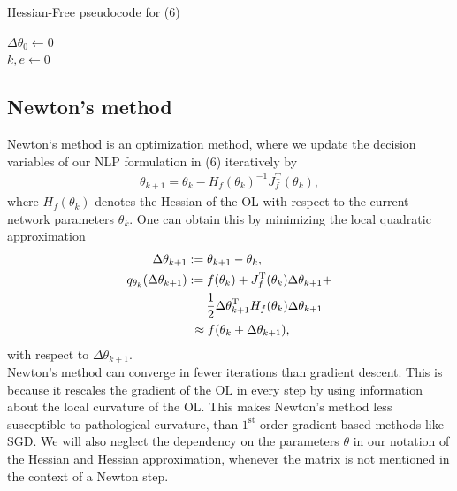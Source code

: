 \documentclass[conference]{IEEEtran}
\begin{document}
	\begin{algorithm}
		\caption{Hessian-Free pseudocode for (6)}\label{alg:two}
		$\Delta\theta_{0}\gets 0$\\
		$k, e\gets 0$\\
		\KwOut{$\theta^{\star}$}
	\end{algorithm}
	\subsection{Newton's method}
	\noindent
	Newton`s method is an optimization method, where we update the decision variables of our NLP formulation in (6) iteratively by
	\begin{align}
	\theta_{k+1} = \theta_{k} -H_{f}(\theta_{k})^{-1} J_{f}^{\mathrm{T}}(\theta_{k}),
	\end{align}
	where $H_{f}(\theta_{k})$ denotes the Hessian of the OL with respect to the current network parameters $\theta_{k}$. One can obtain this by minimizing the local quadratic approximation
	\begin{align}
	\text{ }\Delta\theta_{k+1} &:= \theta_{k+1} - \theta_{k},\\
	q_{\theta_{k}}(\Delta\theta_{k+1})&:= f(\theta_{k}) + J_{f}^{\mathrm{T}}(\theta_{k})\Delta\theta_{k+1} + \notag\\
	&\:\:\:\:\:\:\:\frac{1}{2}\Delta\theta_{k+1}^{\mathrm{T}}H_{f}(\theta_{k})\Delta\theta_{k+1}\\
	&\text{ }\approx f(\theta_{k} + \Delta\theta_{k+1}),
	\end{align}
	with respect to $\Delta\theta_{k+1}$. \\
	Newton's method can converge in fewer iterations than gradient descent. This is because it rescales the gradient of the OL in every step by using information about the local curvature of the OL. This makes Newton's method less susceptible to pathological curvature, than $1^{\text{st}}$-order gradient based methods like SGD. We will also neglect the dependency on the parameters $\theta$ in our notation of the Hessian and Hessian approximation, whenever the matrix is not mentioned in the context of a Newton step.
	
\end{document}
